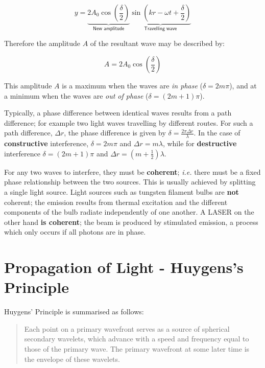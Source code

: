 \documentclass[
]{book}
\begin{document}
\begin{equation}
y = \underbrace{2 A_0 \cos \left( \frac{\delta}{2} \right)}_{\textsf{New amplitude}} \underbrace{\sin \left( kr - \omega t + \frac{\delta}{2} \right)}_{\textsf{Travelling wave}}
\end{equation}

Therefore the amplitude \(A\) of the resultant wave may be described by:

\begin{equation}
A = 2 A_0 \cos \left( \frac{\delta}{2} \right)
\label{eq:ch13-amplitudeinterfere1}
\end{equation}

This amplitude \(A\) is a maximum when the waves are \emph{in phase} (\(\delta = 2m\pi\)), and at a minimum when the waves are \emph{out of phase} (\(\delta = (2m+1)\pi\)).

Typically, a phase difference between identical waves results from a path difference; for example two light waves travelling by different routes. For such a path difference, \(\Delta r\), the phase difference is given by \(\delta = \frac{2 \pi \Delta r}{\lambda}\). In the case of \textbf{constructive} interference, \(\delta = 2m\pi\) and \(\Delta r = m\lambda\), while for \textbf{destructive} interference \(\delta = (2m+1)\pi\) and \(\Delta r = \left(m+\frac{1}{2}\right)\lambda\).

For any two waves to interfere, they must be \textbf{coherent}; \emph{i.e.} there must be a fixed phase relationship between the two sources. This is usually achieved by splitting a single light source. Light sources such as tungsten filament bulbs are \textbf{not} coherent; the emission results from thermal excitation and the different components of the bulb radiate independently of one another. A LASER on the other hand \textbf{is coherent}; the beam is produced by stimulated emission, a process which only occurs if all photons are in phase.

\hypertarget{sec-ch13-lightpropagation}{%
\section{Propagation of Light - Huygens's Principle}\label{sec-ch13-lightpropagation}}

Huygens' Principle is summarised as follows:

\begin{quote}
Each point on a primary wavefront serves as a source of spherical secondary wavelets, which advance with a speed and frequency equal to those of the primary wave. The primary wavefront at some later time is the envelope of these wavelets.
\end{quote}
\end{document}
